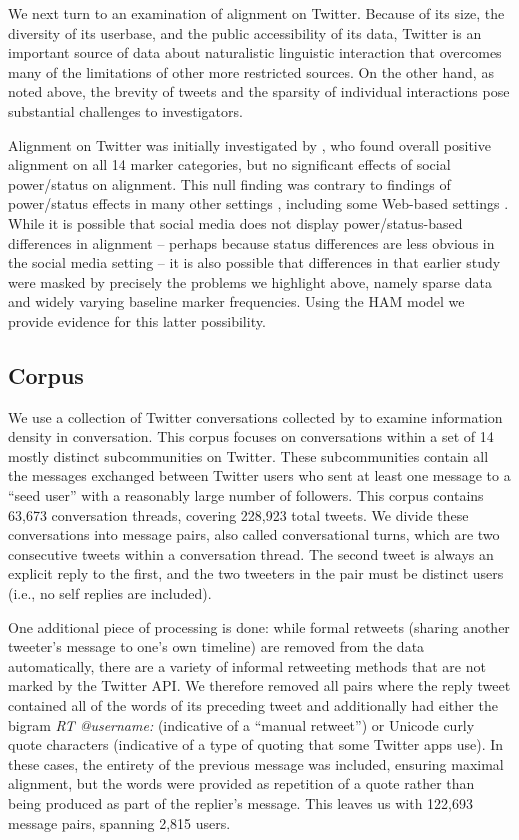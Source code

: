 \documentclass{acm_proc_article-sp}
\begin{document}
We next turn to an examination of alignment on Twitter. Because of its size, the diversity of its userbase, and the public accessibility of its data, Twitter is an important source of data about naturalistic linguistic interaction that overcomes many of the limitations of other more restricted sources. On the other hand, as noted above, the brevity of tweets and the sparsity of individual interactions pose substantial challenges to investigators. 

Alignment on Twitter was initially investigated by \cite{DNMGamonDumais2011}, who found overall positive alignment on all 14 marker categories, but no significant effects of social power/status on alignment. This null finding was contrary to findings of power/status effects in many other settings \cite{Gnisci2005}, including some Web-based settings \cite{DNMEtAl2012,NobleFernandez2015}. While it is possible that social media does not display power/status-based differences in alignment -- perhaps because status differences are less obvious in the social media setting -- it is also possible that differences in that earlier study were masked by precisely the problems we highlight above, namely sparse data and widely varying baseline marker frequencies. Using the HAM model we provide evidence for this latter possibility.

\subsection{Corpus}

We use a collection of Twitter conversations collected by \cite{DoyleFrank2015CMCL} to examine information density in conversation. This corpus focuses on conversations within a set of 14 mostly distinct subcommunities on Twitter.  These subcommunities contain all the messages exchanged between Twitter users who sent at least one message to a ``seed user'' with a reasonably large number of followers. This corpus contains 63,673 conversation threads, covering 228,923 total tweets.  We divide these conversations into message pairs, also called conversational turns, which are two consecutive tweets within a conversation thread.  The second tweet is always an explicit reply to the first, and the two tweeters in the pair must be distinct users (i.e., no self replies are included).  

One additional piece of processing is done: while formal retweets (sharing another tweeter's message to one's own timeline) are removed from the data automatically, there are a variety of informal retweeting methods that are not marked by the Twitter API.  We therefore removed all pairs where the reply tweet contained all of the words of its preceding tweet and additionally had either the bigram \textit{RT @username:} (indicative of a ``manual retweet'') or Unicode curly quote characters (indicative of a type of quoting that some Twitter apps use).  In these cases, the entirety of the previous message was included, ensuring maximal alignment, but the words were provided as repetition of a quote rather than being produced as part of the replier's message.  This leaves us with 122,693 message pairs, spanning 2,815 users.
\end{document}
